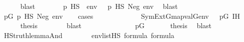 \begin{isabellebody}
\ \ \ \ \isamarkupfalse%
\ blast\isanewline
\ \ \isamarkupfalse%
\isanewline
\ \ \isamarkupfalse%
\ {\isacharparenleft}{\kern0pt}{}{\isacharparenright}{\kern0pt}\ {\isachardoublequoteopen}p\ {\isasymtturnstile}HS\ {\isasymphi}\ env{\isachardoublequoteclose}\ {\isacharbar}{\kern0pt}\ {\isacharparenleft}{\kern0pt}{}{\isacharparenright}{\kern0pt}\ {\isachardoublequoteopen}p\ {\isasymtturnstile}HS\ Neg{\isacharparenleft}{\kern0pt}{\isasymphi}{\isacharparenright}{\kern0pt}\ env{\isachardoublequoteclose}\ \isamarkupfalse%
\ blast\isanewline
\ \ \isamarkupfalse%
\isanewline
\ \ \isamarkupfalse%
\ {\isachardoublequoteopen}{\isasymexists}p{\isasymin}G{\isachardot}{\kern0pt}\ {\isacharparenleft}{\kern0pt}p\ {\isasymtturnstile}HS\ Neg{\isacharparenleft}{\kern0pt}{\isasymphi}{\isacharparenright}{\kern0pt}\ env{\isacharparenright}{\kern0pt}{\isachardoublequoteclose}\isanewline
\ \ \isamarkupfalse%
\ {\isacharparenleft}{\kern0pt}cases{\isacharparenright}{\kern0pt}\isanewline
\ \ \ \ \isamarkupfalse%
\ {}\isanewline
\ \ \ \ \isamarkupfalse%
\ {\isacartoucheopen}{\isasymnot}\ {\isacharparenleft}{\kern0pt}SymExt{\isacharparenleft}{\kern0pt}G{\isacharparenright}{\kern0pt}{\isacharcomma}{\kern0pt}map{\isacharparenleft}{\kern0pt}val{\isacharparenleft}{\kern0pt}G{\isacharparenright}{\kern0pt}{\isacharcomma}{\kern0pt}env{\isacharparenright}{\kern0pt}\ {\isasymTurnstile}\ {\isasymphi}{\isacharparenright}{\kern0pt}{\isacartoucheclose}\ {\isacartoucheopen}p{\isasymin}G{\isacartoucheclose}\ IH\isanewline
\ \ \ \ \isamarkupfalse%
\ {\isacharquery}{\kern0pt}thesis\isanewline
\ \ \ \ \ \ \isamarkupfalse%
\ blast\isanewline
\ \ \isamarkupfalse%
\isanewline
\ \ \ \ \isamarkupfalse%
\ {}\isanewline
\ \ \ \ \isamarkupfalse%
\ {\isacartoucheopen}p{\isasymin}G{\isacartoucheclose}\ \isanewline
\ \ \ \ \isamarkupfalse%
\ {\isacharquery}{\kern0pt}thesis\ \isamarkupfalse%
\ blast\isanewline
\ \ \isamarkupfalse%
\isanewline
{}\isamarkupfalse%
%
\endisatagproof
{\isafoldproof}%
%
\isadelimproof
\ \isanewline
%
\endisadelimproof
\isanewline
{}\isamarkupfalse%
\ HS{\isacharunderscore}{\kern0pt}truth{\isacharunderscore}{\kern0pt}lemma{\isacharunderscore}{\kern0pt}And{\isacharcolon}{\kern0pt}\isanewline
\ \ \ \isanewline
\ \ \ \ {\isachardoublequoteopen}env{\isasymin}list{\isacharparenleft}{\kern0pt}HS{\isacharparenright}{\kern0pt}{\isachardoublequoteclose}\ {\isachardoublequoteopen}{\isasymphi}{\isasymin}formula{\isachardoublequoteclose}\ {\isachardoublequoteopen}{\isasympsi}{\isasymin}formula{\isachardoublequoteclose}\isanewline

\end{isabellebody}
